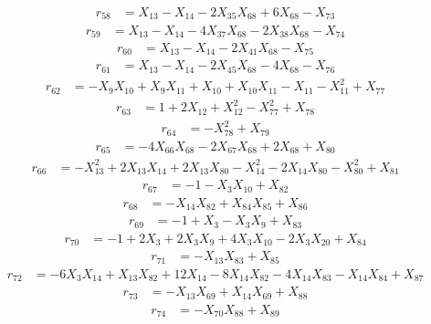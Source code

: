 \begin{align*}
r_{58}&=X_{13}-X_{14}-2X_{35}X_{68}+6X_{68}-X_{73}
\end{align*}
\begin{align*}
r_{59}&=X_{13}-X_{14}-4X_{37}X_{68}-2X_{38}X_{68}-X_{74}
\end{align*}
\begin{align*}
r_{60}&=X_{13}-X_{14}-2X_{41}X_{68}-X_{75}
\end{align*}
\begin{align*}
r_{61}&=X_{13}-X_{14}-2X_{45}X_{68}-4X_{68}-X_{76}
\end{align*}
\begin{align*}
r_{62}&=-X_{9}X_{10}+X_{9}X_{11}+X_{10}+X_{10}X_{11}-X_{11}-X_{11}^{2}+X_{77}
\end{align*}
\begin{align*}
r_{63}&=1+2X_{12}+X_{12}^{2}-X_{77}^{2}+X_{78}
\end{align*}
\begin{align*}
r_{64}&=-X_{78}^{2}+X_{79}
\end{align*}
\begin{align*}
r_{65}&=-4X_{66}X_{68}-2X_{67}X_{68}+2X_{68}+X_{80}
\end{align*}
\begin{align*}
r_{66}&=-X_{13}^{2}+2X_{13}X_{14}+2X_{13}X_{80}-X_{14}^{2}-2X_{14}X_{80}-X_{80}^{2}+X_{81}
\end{align*}
\begin{align*}
r_{67}&=-1-X_{3}X_{10}+X_{82}
\end{align*}
\begin{align*}
r_{68}&=-X_{14}X_{82}+X_{84}X_{85}+X_{86}
\end{align*}
\begin{align*}
r_{69}&=-1+X_{3}-X_{3}X_{9}+X_{83}
\end{align*}
\begin{align*}
r_{70}&=-1+2X_{3}+2X_{3}X_{9}+4X_{3}X_{10}-2X_{3}X_{20}+X_{84}
\end{align*}
\begin{align*}
r_{71}&=-X_{13}X_{83}+X_{85}
\end{align*}
\begin{align*}
r_{72}&=-6X_{3}X_{14}+X_{13}X_{82}+12X_{14}-8X_{14}X_{82}-4X_{14}X_{83}-X_{14}X_{84}+X_{87}
\end{align*}
\begin{align*}
r_{73}&=-X_{13}X_{69}+X_{14}X_{69}+X_{88}
\end{align*}
\begin{align*}
r_{74}&=-X_{70}X_{88}+X_{89}
\end{align*}
